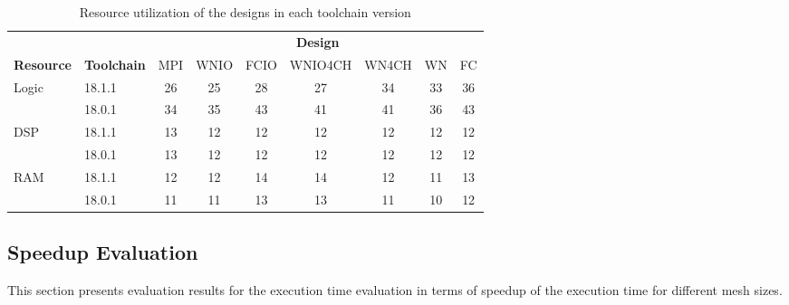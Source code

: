 \begin{table}[ht]
    \centering
    \caption{Resource utilization of the designs in each toolchain version}
    \label{tab:sys_resource}
    \begin{tabular}{llccccccc}
     &  & \multicolumn{7}{c}{\textbf{Design}} \\
     \cline{3-9}
     \textbf{Resource} & \textbf{Toolchain} & MPI & WNIO & FCIO & WNIO4CH & WN4CH & WN & FC \\
    \hline
    \multirow{2}{*}{Logic} & 18.1.1 & 26 & 25 & 28 & 27 & 34 & 33 & 36 \\
    \cline{2-9}
     & 18.0.1 & 34 & 35 & 43 & 41 & 41 & 36 & 43 \\
     \cline{1-9}
    \multirow{2}{*}{DSP} & 18.1.1 & 13 & 12 & 12 & 12 & 12 & 12 & 12 \\
    \cline{2-9}
     & 18.0.1 & 13 & 12 & 12 & 12 & 12 & 12 & 12 \\
     \cline{1-9}
    \multirow{2}{*}{RAM} & 18.1.1 & 12 & 12 & 14 & 14 & 12 & 11 & 13 \\
    \cline{2-9}
     & 18.0.1 & 11 & 11 & 13 & 13 & 11 & 10 & 12 \\
     \hline
    \end{tabular}
\end{table}


\subsection{Speedup Evaluation}

This section presents evaluation results for the execution time evaluation
in terms of speedup of the execution time for different mesh sizes.

